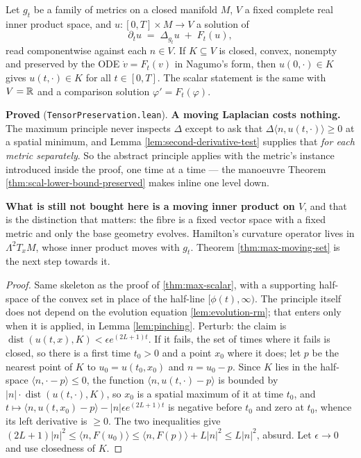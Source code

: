 \begin{theorem}
  \label{thm:max-moving}
  \leanok
  Let $g_t$ be a family of metrics on a closed manifold $M$, $V$ a fixed complete real
  inner product space, and $u : [0,T] \times M \to V$ a solution of
  \[
    \partial_t u \;=\; \Delta_{g_t} u \;+\; F_t(u),
  \]
  read componentwise against each $n \in V$. If $K \subseteq V$ is closed, convex,
  nonempty and preserved by the ODE $\dot v = F_t(v)$ in Nagumo's form, then
  $u(0,\cdot) \in K$ gives $u(t,\cdot) \in K$ for all $t \in [0,T]$. The scalar statement
  is the same with $V = \mathbb{R}$ and a comparison solution $\varphi' = F_t(\varphi)$.

  \textbf{Proved} (\texttt{TensorPreservation.lean}). \textbf{A moving Laplacian costs
  nothing.} The maximum principle never inspects $\Delta$ except to ask that
  $\Delta\langle n, u(t,\cdot)\rangle \ge 0$ at a spatial minimum, and Lemma
  \ref{lem:second-derivative-test} supplies that \emph{for each metric separately}. So the
  abstract principle applies with the metric's instance introduced inside the proof, one
  time at a time --- the manoeuvre Theorem \ref{thm:scal-lower-bound-preserved} makes
  inline one level down.

  \textbf{What is still not bought here is a moving inner product on $V$}, and that is the
  distinction that matters: the fibre is a fixed vector space with a fixed metric and only
  the base geometry evolves. Hamilton's curvature operator lives in $\Lambda^2T_xM$, whose
  inner product moves with $g_t$. Theorem \ref{thm:max-moving-set} is the next step towards
  it.
\end{theorem}

\begin{proof}
  \leanok
  Same skeleton as the proof of \ref{thm:max-scalar}, with a supporting
  half-space of the convex set in place of the half-line $[\phi(t),\infty)$.
  The principle itself does not depend on the evolution equation
  \ref{lem:evolution-rm}; that enters only when it is applied, in Lemma
  \ref{lem:pinching}. Perturb: the claim is $\operatorname{dist}(u(t,x), K) < \epsilon
  e^{(2L+1)t}$. If it fails, the set of times where it fails is closed, so
  there is a first time $t_0 > 0$ and a point $x_0$ where it does; let $p$ be
  the nearest point of $K$ to $u_0 = u(t_0,x_0)$ and $n = u_0 - p$. Since $K$
  lies in the half-space $\langle n, \cdot - p\rangle \le 0$, the function
  $\langle n, u(t,\cdot) - p\rangle$ is bounded by $|n| \cdot
  \operatorname{dist}(u(t,\cdot), K)$, so $x_0$ is a spatial maximum of it at
  time $t_0$, and $t \mapsto \langle n, u(t,x_0) - p\rangle - |n| \epsilon
  e^{(2L+1)t}$ is negative before $t_0$ and zero at $t_0$, whence its left
  derivative is $\ge 0$. The two inequalities give $(2L+1)|n|^2 \le \langle n,
  F(u_0)\rangle \le \langle n, F(p)\rangle + L|n|^2 \le L|n|^2$, absurd. Let
  $\epsilon \to 0$ and use closedness of $K$.
\end{proof}

